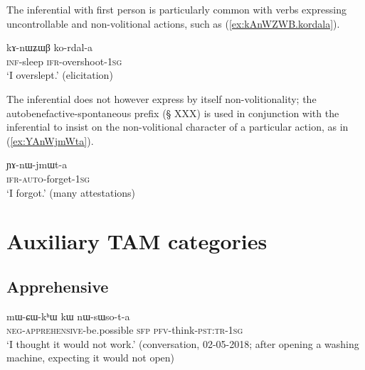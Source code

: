 
The inferential with first person is particularly common with verbs expressing uncontrollable and non-volitional actions, such as (\ref{ex:kAnWZWB.kordala}). 

\begin{exe}
\ex \label{ex:kAnWZWB.kordala}
\gll kɤ-nɯʑɯβ ko-rdal-a \\
\textsc{inf}-sleep \textsc{ifr}-overshoot-\textsc{1sg} \\
\glt `I overslept.' (elicitation)
\end{exe}

The inferential does not however express by itself non-volitionality; the autobenefactive-spontaneous prefix  (§ XXX) is used in conjunction with the inferential to insist on the non-volitional character of a particular action, as in (\ref{ex:YAnWjmWta}).

\begin{exe}
\ex \label{ex:YAnWjmWta}
\gll ɲɤ-nɯ-jmɯt-a \\
 \textsc{ifr}-\textsc{auto}-forget-\textsc{1sg} \\
\glt `I forgot.' (many attestations)
\end{exe}

  \section{Auxiliary TAM categories}
  
  \subsection{Apprehensive}
  
\begin{exe}
\ex 
\gll   mɯ-ɕɯ-kʰɯ kɯ nɯ-sɯso-t-a \\
\textsc{neg}-\textsc{apprehensive}-be.possible \textsc{sfp} \textsc{pfv}-think-\textsc{pst}:\textsc{tr}-\textsc{1sg} \\
\glt `I thought it would not work.'  (conversation, 02-05-2018; after opening a washing machine, expecting it would not open)
\end{exe}

